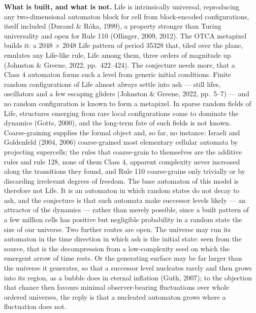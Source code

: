 \documentclass[
]{article}
\begin{document}
\textbf{What is built, and what is not.} Life is intrinsically
universal, reproducing any two-dimensional automaton block for cell from
block-encoded configurations, itself included (Durand \& Róka, 1999), a
property stronger than Turing universality and open for Rule 110
(Ollinger, 2009, 2012). The OTCA metapixel builds it: a 2048 × 2048 Life
pattern of period 35328 that, tiled over the plane, emulates any
Life-like rule, Life among them, three orders of magnitude up (Johnston
\& Greene, 2022, pp.~422--424). The conjecture needs more, that a Class
4 automaton forms such a level from generic initial conditions. Finite
random configurations of Life almost always settle into ash --- still
lifes, oscillators and a few escaping gliders (Johnston \& Greene, 2022,
pp.~5--7) --- and no random configuration is known to form a metapixel.
In sparse random fields of Life, structures emerging from rare local
configurations come to dominate the dynamics (Gotts, 2000), and the
long-term fate of such fields is not known. Coarse-graining supplies the
formal object and, so far, no instance: Israeli and Goldenfeld (2004,
2006) coarse-grained most elementary cellular automata by projecting
supercells; the rules that coarse-grain to themselves are the additive
rules and rule 128, none of them Class 4, apparent complexity never
increased along the transitions they found, and Rule 110 coarse-grains
only trivially or by discarding irrelevant degrees of freedom. The base
automaton of this model is therefore not Life. It is an automaton in
which random states do not decay to ash, and the conjecture is that such
automata make successor levels likely --- an attractor of the dynamics
--- rather than merely possible, since a built pattern of a few million
cells has positive but negligible probability in a random state the size
of our universe. Two further routes are open. The universe may run its
automaton in the time direction in which ash is the initial state: seen
from the source, that is the decompression from a low-complexity seed on
which the emergent arrow of time rests. Or the generating surface may be
far larger than the universe it generates, so that a successor level
nucleates rarely and then grows into its region, as a bubble does in
eternal inflation (Guth, 2007); to the objection that chance then
favours minimal observer-bearing fluctuations over whole ordered
universes, the reply is that a nucleated automaton grows where a
fluctuation does not.
\end{document}
